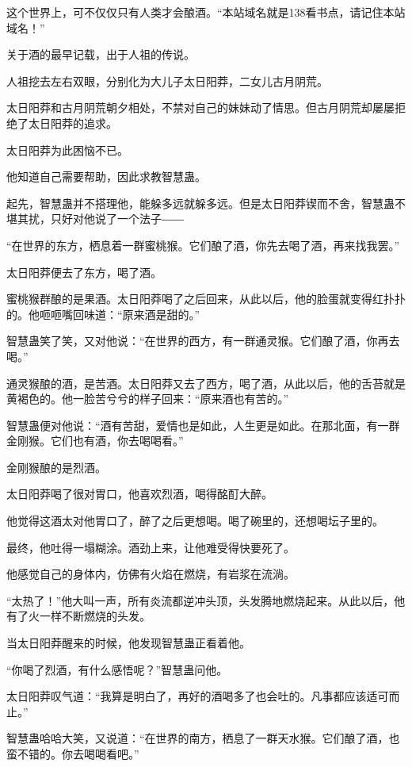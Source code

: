 
\begin{this_body}

这个世界上，可不仅仅只有人类才会酿酒。“本站域名就是138看书点，请记住本站域名！”

关于酒的最早记载，出于人祖的传说。

人祖挖去左右双眼，分别化为大儿子太日阳莽，二女儿古月阴荒。

太日阳莽和古月阴荒朝夕相处，不禁对自己的妹妹动了情思。但古月阴荒却屡屡拒绝了太日阳莽的追求。

太日阳莽为此困恼不已。

他知道自己需要帮助，因此求教智慧蛊。

起先，智慧蛊并不搭理他，能躲多远就躲多远。但是太日阳莽锲而不舍，智慧蛊不堪其扰，只好对他说了一个法子――

“在世界的东方，栖息着一群蜜桃猴。它们酿了酒，你先去喝了酒，再来找我罢。”

太日阳莽便去了东方，喝了酒。

蜜桃猴群酿的是果酒。太日阳莽喝了之后回来，从此以后，他的脸蛋就变得红扑扑的。他咂咂嘴回味道：“原来酒是甜的。”

智慧蛊笑了笑，又对他说：“在世界的西方，有一群通灵猴。它们酿了酒，你再去喝。”

通灵猴酿的酒，是苦酒。太日阳莽又去了西方，喝了酒，从此以后，他的舌苔就是黄褐色的。他一脸苦兮兮的样子回来：“原来酒也有苦的。”

智慧蛊便对他说：“酒有苦甜，爱情也是如此，人生更是如此。在那北面，有一群金刚猴。它们也有酒，你去喝喝看。”

金刚猴酿的是烈酒。

太日阳莽喝了很对胃口，他喜欢烈酒，喝得酩酊大醉。

他觉得这酒太对他胃口了，醉了之后更想喝。喝了碗里的，还想喝坛子里的。

最终，他吐得一塌糊涂。酒劲上来，让他难受得快要死了。

他感觉自己的身体内，仿佛有火焰在燃烧，有岩浆在流淌。

“太热了！”他大叫一声，所有炎流都逆冲头顶，头发腾地燃烧起来。从此以后，他有了火一样不断燃烧的头发。

当太日阳莽醒来的时候，他发现智慧蛊正看着他。

“你喝了烈酒，有什么感悟呢？”智慧蛊问他。

太日阳莽叹气道：“我算是明白了，再好的酒喝多了也会吐的。凡事都应该适可而止。”

智慧蛊哈哈大笑，又说道：“在世界的南方，栖息了一群天水猴。它们酿了酒，也蛮不错的。你去喝喝看吧。”


\end{this_body}
